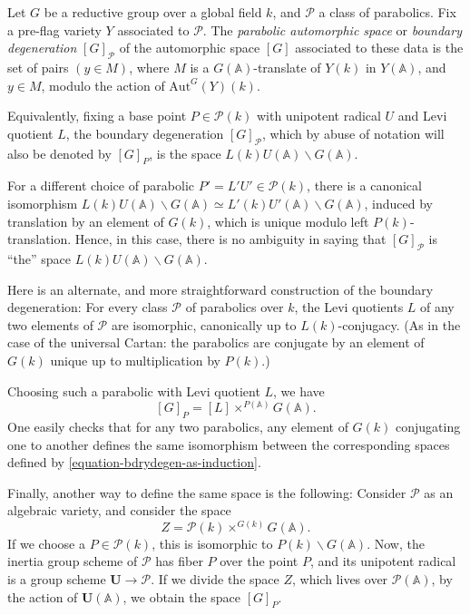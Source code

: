 \begin{definition}
 \label{definition-boundary-degeneration}
Let $G$ be a reductive group over a global field $k$, and $\mathcal P$ a class of parabolics. Fix a pre-flag variety $Y$ associated to $\mathcal P$.
The {\it parabolic automorphic space} or {\it boundary degeneration} $[G]_{\mathcal P}$ of the automorphic space $[G]$ associated to these data is the set of pairs $(y \in M)$, where $M$ is a $G(\mathbb A)$-translate of $Y(k)$ in $Y(\mathbb A)$, and $y\in M$,  modulo the action of $\text{Aut}^G(Y)(k)$. 

Equivalently, fixing a base point $P\in \mathcal P(k)$ with unipotent radical $U$ and Levi quotient $L$, the boundary degeneration $[G]_{\mathcal P}$, which by abuse of notation will also be denoted by $[G]_P$, is the space $L(k)U(\mathbb A)\backslash G(\mathbb A)$.
\end{definition}

\begin{remark}
 \label{remark-boundary-degeneration}
For a different choice of parabolic $P'= L' U'\in \mathcal P(k)$, there is a canonical isomorphism $ L(k)U(\mathbb A)\backslash G(\mathbb A) \simeq L'(k)U'(\mathbb A)\backslash G(\mathbb A)$, induced by translation by an element of $G(k)$, which is unique modulo left $P(k)$-translation. Hence, in this case, there is no ambiguity in saying that $[G]_{\mathcal P}$ is ``the'' space $L(k)U(\mathbb A)\backslash G(\mathbb A)$.
\end{remark}

\begin{remark}
 \label{remark-bdrydegen-as-induction}
Here is an alternate, and more straightforward construction of the boundary degeneration: For every class $\mathcal P$ of parabolics over $k$, the Levi quotients $L$ of any two elements of $\mathcal P$ are isomorphic, canonically up to $L(k)$-conjugacy. (As in the case of the universal Cartan: the parabolics are conjugate by an element of $G(k)$ unique up to multiplication by $P(k)$.)

Choosing such a parabolic with Levi quotient $L$, we have 
\begin{equation}
 \label{equation-bdrydegen-as-induction}
[G]_P = [L]\times^{P(\mathbb A)} G(\mathbb A).
\end{equation}
One easily checks that for any two parabolics, any element of $G(k)$ conjugating one to another defines the same isomorphism between the corresponding spaces defined by \eqref{equation-bdrydegen-as-induction}.

Finally, another way to define the same space is the following: Consider $\mathcal P$ as an algebraic variety, and consider the space
$$ Z= \mathcal P(k)\times^{G(k)} G(\mathbb A).$$
If we choose a $P\in \mathcal P(k)$, this is isomorphic to $P(k)\backslash G(\mathbb A)$. Now, the inertia group scheme of $\mathcal P$ has fiber $P$ over the point $P$, and its unipotent radical is a group scheme $\mathbf U\to \mathcal P$. If we divide the space $Z$, which lives over $\mathcal P(\mathbb A)$, by the action of $\mathbf U(\mathbb A)$, we obtain the space $[G]_P$.
\end{remark}



